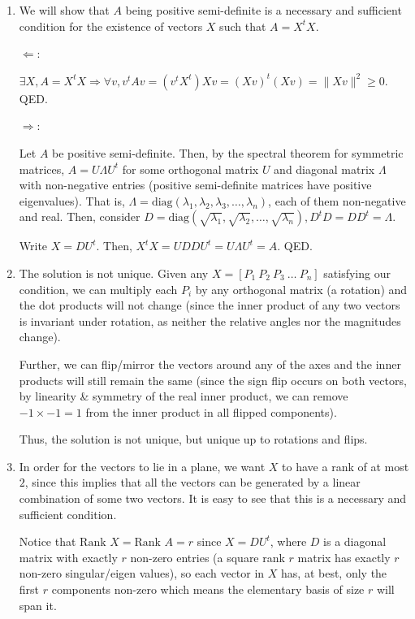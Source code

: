 \documentclass[12pt]{article}
\newenvironment*{qparts}{\begin{enumerate}[label=(\alph*)]}{\end{enumerate}}
\begin{document}
\begin{qparts}
	\item We will show that $A$ being positive semi-definite is a necessary and sufficient condition for the existence of vectors $X$ such that $A = X^tX$.\bigskip
	
	$\Leftarrow$:

	$\exists X, A = X^tX \Rightarrow \forall v, v^tAv = (v^tX^t)Xv = (Xv)^t(Xv) = \lVert Xv \rVert^2 \geq 0$. QED.\bigskip

	$\Rightarrow$:

	Let $A$ be positive semi-definite. Then, by the spectral theorem for symmetric matrices, $A = U\Lambda U^t$ for some orthogonal matrix $U$ and diagonal matrix $\Lambda$ with non-negative entries (positive semi-definite matrices have positive eigenvalues). That is, $\Lambda = \text{diag}(\lambda_1, \lambda_2, \lambda_3, \dots, \lambda_n)$, each of them non-negative and real. Then, consider $D = \text{diag}(\sqrt{\lambda_1}, \sqrt{\lambda_2}, \dots, \sqrt{\lambda_n}), D^tD = DD^t = \Lambda$. \medskip

	Write $X = DU^t$. Then, $X^tX = UDDU^t = U\Lambda U^t = A$. QED.

	\item The solution is not unique. Given any $X = [P_1\ P_2\ P_3\ \dots\ P_n]$ satisfying our condition, we can multiply each $P_i$ by any orthogonal matrix (a rotation) and the dot products will not change (since the inner product of any two vectors is invariant under rotation, as neither the relative angles nor the magnitudes change).\medskip
	
	Further, we can flip/mirror the vectors around any of the axes and the inner  products will still remain the same (since the sign flip occurs on both vectors, by linearity \& symmetry of the real inner product, we can remove $-1 \times -1 = 1$ from the inner product in all flipped components).\medskip

	Thus, the solution is not unique, but unique up to rotations and flips.

	\item In order for the vectors to lie in a plane, we want $X$ to have a rank of at most $2$, since this implies that all the vectors can be generated by a linear combination of some two vectors. It is easy to see that this is a necessary and sufficient condition.\medskip
	
	Notice that $\text{Rank } X = \text{Rank } A = r$ since $X = DU^t$, where $D$ is a diagonal matrix with exactly $r$ non-zero entries (a square rank $r$ matrix has exactly $r$ non-zero singular/eigen values), so each vector in $X$ has, at best, only the first $r$ components non-zero which means the elementary basis of size $r$ will span it.\medskip


\end{qparts}
\end{document}
